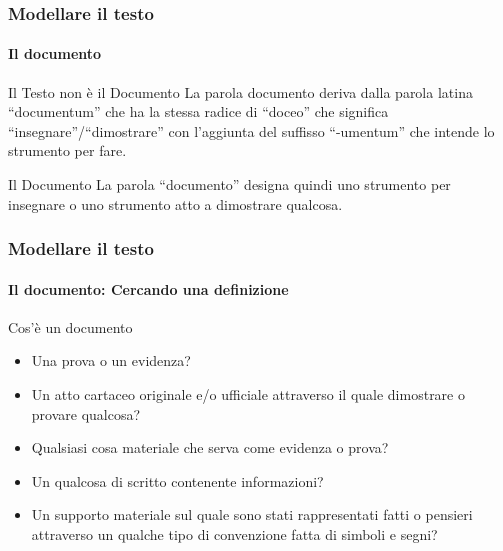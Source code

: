 

\begin{frame}
	\frametitle{Modellare il testo}
	\framesubtitle{Il documento}
	\addtocounter{nframe}{1}

	\begin{block}{Il Testo non è il Documento}
		La parola documento deriva dalla parola latina ``documentum'' che ha la stessa radice di ``doceo'' che significa ``insegnare''/``dimostrare'' con l'aggiunta del suffisso ``-umentum'' che intende lo strumento per fare.
	\end{block}

	\begin{block}{Il Documento}
		La parola ``documento'' designa quindi uno strumento per insegnare o uno strumento atto a dimostrare qualcosa.
	\end{block}


\end{frame}

\begin{frame}
	\frametitle{Modellare il testo}
	\framesubtitle{Il documento: Cercando una definizione}
	\addtocounter{nframe}{1}

	\begin{block}{Cos'è un documento}
		\begin{itemize}
			\item Una prova o un evidenza?
			\item Un atto cartaceo originale e/o ufficiale attraverso il quale dimostrare o provare qualcosa?
			\item Qualsiasi cosa materiale che serva come evidenza o prova?
			\item Un qualcosa di scritto contenente informazioni?
			\item Un supporto materiale sul quale sono stati rappresentati fatti o pensieri attraverso un qualche tipo di convenzione fatta di simboli e segni?
		\end{itemize}

	\end{block}

\end{frame}





